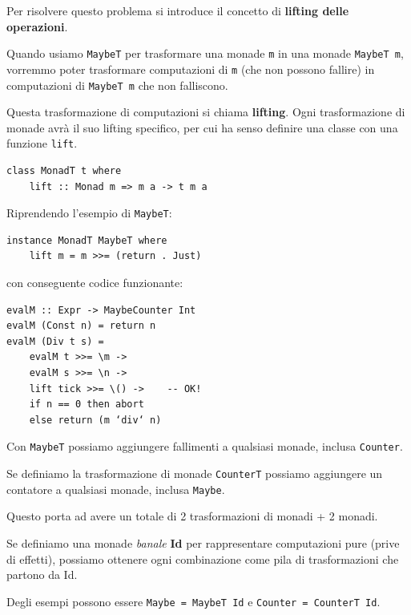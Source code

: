 \documentclass{article}
\begin{document}
Per risolvere questo problema si introduce il concetto di \textbf{lifting delle operazioni}.

Quando usiamo \texttt{MaybeT} per trasformare una monade \texttt{m} in una monade \texttt{MaybeT m}, vorremmo poter trasformare computazioni di \texttt{m} (che non possono fallire) in computazioni di \texttt{MaybeT m} che non falliscono.

Questa trasformazione di computazioni si chiama \textbf{lifting}. Ogni trasformazione di monade avrà il suo lifting specifico, per cui ha senso definire una classe con una funzione \texttt{lift}.
\begin{tcolorbox}
\begin{verbatim}
class MonadT t where
    lift :: Monad m => m a -> t m a
\end{verbatim}
\end{tcolorbox}
\vspace{8pt}
Riprendendo l'esempio di \texttt{MaybeT}:
\begin{tcolorbox}
\begin{verbatim}
instance MonadT MaybeT where
    lift m = m >>= (return . Just)
\end{verbatim}
\end{tcolorbox}
con conseguente codice funzionante:
\begin{tcolorbox}
\begin{verbatim}
evalM :: Expr -> MaybeCounter Int
evalM (Const n) = return n
evalM (Div t s) =
    evalM t >>= \m ->
    evalM s >>= \n ->
    lift tick >>= \() ->    -- OK!
    if n == 0 then abort
    else return (m ‘div‘ n)
\end{verbatim}
\end{tcolorbox}

\pagebreak

Con \texttt{MaybeT} possiamo aggiungere fallimenti a qualsiasi monade, inclusa \texttt{Counter}. 

Se definiamo la trasformazione di monade \texttt{CounterT} possiamo aggiungere un contatore a qualsiasi monade, inclusa \texttt{Maybe}.

Questo porta ad avere un totale di 2 trasformazioni di monadi + 2 monadi.

Se definiamo una monade \textit{banale} \textbf{Id} per rappresentare computazioni pure (prive di effetti), possiamo ottenere ogni combinazione come pila di trasformazioni che partono da Id.

Degli esempi possono essere \texttt{Maybe = MaybeT Id} e \texttt{Counter = CounterT Id}.
\end{document}
